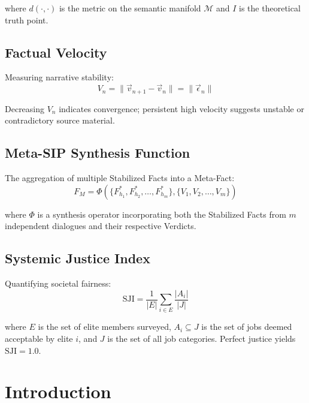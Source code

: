 \documentclass[11pt,a4paper]{article}
\begin{document}
\begin{small}
where $d(\cdot,\cdot)$ is the metric on the semantic manifold $\mathcal{M}$ and $I$ is the theoretical truth point.

\subsection*{Factual Velocity}
Measuring narrative stability:
\begin{equation}
V_n = \|\vec{v}_{n+1} - \vec{v}_n\| = \|\vec{\epsilon}_n\|
\label{eq:velocity}
\end{equation}

\noindent Decreasing $V_n$ indicates convergence; persistent high velocity suggests unstable or contradictory source material.

\subsection*{Meta-SIP Synthesis Function}
The aggregation of multiple Stabilized Facts into a Meta-Fact:
\begin{equation}
F_M = \Phi\left(\{F_{h_1}^*, F_{h_2}^*, \ldots, F_{h_m}^*\}, \{V_1, V_2, \ldots, V_m\}\right)
\label{eq:metasip}
\end{equation}

where $\Phi$ is a synthesis operator incorporating both the Stabilized Facts from $m$ independent dialogues and their respective Verdicts.

\subsection*{Systemic Justice Index}
Quantifying societal fairness:
\begin{equation}
\text{SJI} = \frac{1}{|E|} \sum_{i \in E} \frac{|A_i|}{|J|}
\label{eq:sji}
\end{equation}

where $E$ is the set of elite members surveyed, $A_i \subseteq J$ is the set of jobs deemed acceptable by elite $i$, and $J$ is the set of all job categories. Perfect justice yields $\text{SJI} = 1.0$.

\vspace{0.5cm}
\clearpage
\setcounter{page}{1}


\section{Introduction}


\end{small}
\end{document}
